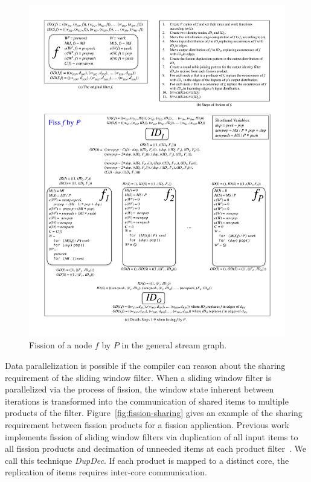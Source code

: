 \begin{figure}
\centering
\includegraphics[width=\textwidth]{figures/general-fission.pdf}
\caption[Fission of a node in the general stream graph.]{Fission of a
  node $f$ by $P$ in the general stream
  graph.\label{fig:general-fission}}
\end{figure}


Data parallelization is possible if the compiler can reason about the
sharing requirement of the sliding window filter.  When a sliding
window filter is parallelized via the process of fission, the window
state inherent between iterations is transformed into the
communication of shared items to multiple products of the filter.
Figure~\ref{fig:fission-sharing} gives an example of the sharing
requirement between fission products for a fission application. 
Previous work implements fission of sliding window filters via
duplication of all input items to all fission products and decimation
of unneeded items at each product filter~\cite{streamit-asplos}.  We
call this technique {\it DupDec}. If each product is mapped to a
distinct core, the replication of items requires inter-core communication.

